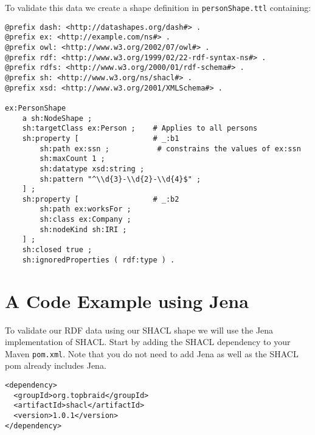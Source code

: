 \documentclass{amsart}
\begin{document}
  To validate this data we create a shape definition in \texttt{personShape.ttl} containing:
  \begin{small}
  \begin{Verbatim}  
@prefix dash: <http://datashapes.org/dash#> .
@prefix ex: <http://example.com/ns#> .
@prefix owl: <http://www.w3.org/2002/07/owl#> .
@prefix rdf: <http://www.w3.org/1999/02/22-rdf-syntax-ns#> .
@prefix rdfs: <http://www.w3.org/2000/01/rdf-schema#> .
@prefix sh: <http://www.w3.org/ns/shacl#> .
@prefix xsd: <http://www.w3.org/2001/XMLSchema#> .

ex:PersonShape
	a sh:NodeShape ;
	sh:targetClass ex:Person ;    # Applies to all persons
	sh:property [                 # _:b1
		sh:path ex:ssn ;           # constrains the values of ex:ssn
		sh:maxCount 1 ;
		sh:datatype xsd:string ;
		sh:pattern "^\\d{3}-\\d{2}-\\d{4}$" ;
	] ;
	sh:property [                 # _:b2
		sh:path ex:worksFor ;
		sh:class ex:Company ;
		sh:nodeKind sh:IRI ;
	] ;
	sh:closed true ;
	sh:ignoredProperties ( rdf:type ) . 
  \end{Verbatim}
  \end{small}
  
  
  \section{A Code Example using Jena}
  To validate our RDF data using our SHACL shape we will use the Jena implementation of SHACL. Start by adding the SHACL dependency to your Maven \texttt{pom.xml}. Note that you do not need to add Jena as well as the SHACL pom already includes Jena.
  
  \begin{small}
  \begin{Verbatim} 
<dependency>
  <groupId>org.topbraid</groupId>
  <artifactId>shacl</artifactId>
  <version>1.0.1</version>
</dependency>
  \end{Verbatim}
  \end{small}  
  
\end{document}
